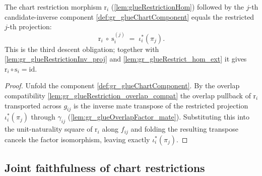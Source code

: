 \begin{lemma}\leanok
  \label{lem:gr_glueRestrictionHom_glueChartComponent}
  The chart restriction morphism \(\mathrm{r}_i\) (\cref{lem:glueRestrictionHom})
  followed by the \(j\)-th candidate-inverse component \cref{def:gr_glueChartComponent}
  equals the restricted \(j\)-th projection:
  \[
    \mathrm{r}_i\ \circ\ \mathrm{s}_i^{(j)}
      \;=\; \iota_i^{*}(\pi_j).
  \]
  This is the third descent obligation; together with
  \cref{lem:gr_glueRestrictionInv_proj} and \cref{lem:gr_glueRestrict_hom_ext} it gives
  \(\mathrm{r}_i \circ \mathrm{s}_i = \mathrm{id}\).
\end{lemma}
\begin{proof}
    \leanok
  Unfold the component \cref{def:gr_glueChartComponent}. By the overlap compatibility
  \cref{lem:gr_glueRestriction_overlap_compat} the overlap pullback of \(\mathrm{r}_i\)
  transported across \(g_{ij}\) is the inverse mate transpose of the restricted
  projection \(\iota_i^{*}(\pi_j)\) through \(\gamma_{ij}\)
  (\cref{lem:gr_glueOverlapFactor_mate}). Substituting this into the unit-naturality
  square of \(\mathrm{r}_i\) along \(f_{ij}\) and folding the resulting transpose
  cancels the factor isomorphism, leaving exactly \(\iota_i^{*}(\pi_j)\).
\end{proof}

\subsection{Joint faithfulness of chart restrictions}


